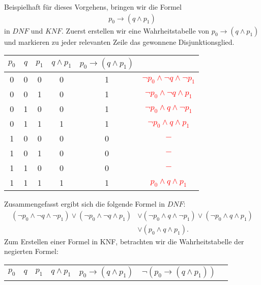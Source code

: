 \begin{example}
    Beispielhaft für dieses Vorgehens, bringen wir die Formel
    \begin{align*}
        p_0\to (q\land p_1)
    \end{align*}
    in $DNF$ und $KNF$.
    \tcblower
    Zuerst erstellen wir eine Wahrheitstabelle von $p_0\to (q\land p_1)$ und markieren zu jeder relevanten Zeile das gewonnene Disjunktionsglied.
    \begin{center}
        \begin{tabular} {| c | c | c || c | c | c |}
            \hline
            $p_0$ & $q$ & $p_1$ & $q\land p_1$ & $p_0\to (q\land p_1)$ & \\
            \hline
            0 & 0 & 0 & 0 & 1 & \textcolor{red}{$\neg p_0 \land \neg q\land \neg p_1$}\\
            0 & 0 & 1 & 0 & 1 & \textcolor{red}{$\neg p_0 \land \neg q\land      p_1$}\\
            0 & 1 & 0 & 0 & 1 & \textcolor{red}{$\neg p_0 \land      q\land \neg p_1$}\\
            0 & 1 & 1 & 1 & 1 & \textcolor{red}{$\neg p_0 \land      q\land      p_1$}\\
            1 & 0 & 0 & 0 & 0 & \textcolor{red}{$-$}\\
            1 & 0 & 1 & 0 & 0 & \textcolor{red}{$-$}\\
            1 & 1 & 0 & 0 & 0 & \textcolor{red}{$-$}\\
            1 & 1 & 1 & 1 & 1 & \textcolor{red}{$     p_0 \land      q\land      p_1$}\\
            \hline
        \end{tabular}
    \end{center}
    \smallskip
    Zusammengefasst ergibt sich die folgende Formel in $DNF$:
    \begin{align*}
       (\neg p_0 \land \neg q\land \neg p_1)
       \lor (\neg p_0 \land \neg q\land      p_1)
       &\lor (\neg p_0 \land      q\land \neg p_1)
       \lor (\neg p_0 \land      q\land      p_1)\\
       &\lor      (p_0 \land      q\land      p_1).
    \end{align*}
    Zum Erstellen einer Formel in KNF, betrachten wir die Wahrheitstabelle der negierten Formel:
    \begin{center}
        \begin{tabular} {| c | c | c || c | c | c | c |}
            \hline
            $p_0$ & $q$ & $p_1$ & $q\land p_1$ & $p_0\to (q\land p_1)$ & $\neg(p_0\to (q\land p_1))$ & \\

\end{tabular}
\end{center}
\end{example}
